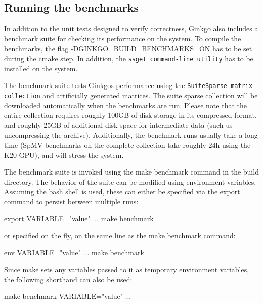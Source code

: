 \subsection*{Running the benchmarks }

In addition to the unit tests designed to verify correctness, Ginkgo also includes a benchmark suite for checking its performance on the system. To compile the benchmarks, the flag {\ttfamily -\/\+D\+G\+I\+N\+K\+G\+O\+\_\+\+B\+U\+I\+L\+D\+\_\+\+B\+E\+N\+C\+H\+M\+A\+R\+KS=ON} has to be set during the {\ttfamily cmake} step. In addition, the \href{https://github.com/ginkgo-project/ssget}{\tt {\ttfamily ssget} command-\/line utility} has to be installed on the system.

The benchmark suite tests Ginkgo\textquotesingle{}s performance using the \href{https://sparse.tamu.edu/}{\tt Suite\+Sparse matrix collection} and artificially generated matrices. The suite sparse collection will be downloaded automatically when the benchmarks are run. Please note that the entire collection requires roughly 100\+GB of disk storage in its compressed format, and roughly 25\+GB of additional disk space for intermediate data (such us uncompressing the archive). Additionally, the benchmark runs usually take a long time (Sp\+MV benchmarks on the complete collection take roughly 24h using the K20 G\+PU), and will stress the system.

The benchmark suite is invoked using the {\ttfamily make benchmark} command in the build directory. The behavior of the suite can be modified using environment variables. Assuming the {\ttfamily bash} shell is used, these can either be specified via the {\ttfamily export} command to persist between multiple runs\+:


\begin{DoxyCode}
export VARIABLE="value"
...
make benchmark
\end{DoxyCode}


or specified on the fly, on the same line as the {\ttfamily make benchmark} command\+:


\begin{DoxyCode}
env VARIABLE="value" ... make benchmark
\end{DoxyCode}


Since {\ttfamily make} sets any variables passed to it as temporary environment variables, the following shorthand can also be used\+:


\begin{DoxyCode}
make benchmark VARIABLE="value" ...
\end{DoxyCode}


